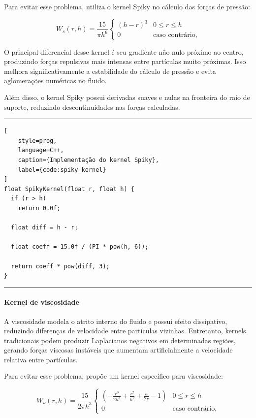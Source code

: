 Para evitar esse problema, \cite{muller2003particle} utiliza o kernel Spiky no
cálculo das forças de pressão:

\begin{equation}
W_{s}(r,h) =
\frac{15}{\pi h^6}
\begin{cases}
(h-r)^3 & 0 \le r \le h \\
0       & \text{caso contrário,}
\end{cases}
\label{eq:spiky_kernel}
\end{equation}

O principal diferencial desse kernel é seu gradiente não nulo próximo ao
centro, produzindo forças repulsivas mais intensas entre partículas muito
próximas. Isso melhora significativamente a estabilidade do cálculo de pressão
e evita aglomerações numéricas no fluido.

Além disso, o kernel Spiky possui derivadas suaves e nulas na fronteira do raio
de suporte, reduzindo descontinuidades nas forças calculadas.

\hfill
\hrule
\begin{lstlisting}[
    style=prog,
    language=C++,
    caption={Implementação do kernel Spiky},
    label={code:spiky_kernel}
]
float SpikyKernel(float r, float h) {
  if (r > h)
    return 0.0f;

  float diff = h - r;

  float coeff = 15.0f / (PI * pow(h, 6));

  return coeff * pow(diff, 3);
}
\end{lstlisting}
\hrule

\paragraph{Kernel de viscosidade}

A viscosidade modela o atrito interno do fluido e possui efeito dissipativo,
reduzindo diferenças de velocidade entre partículas vizinhas. Entretanto,
kernels tradicionais podem produzir Laplacianos negativos em determinadas
regiões, gerando forças viscosas instáveis que aumentam artificialmente a
velocidade relativa entre partículas.

Para evitar esse problema, \cite{muller2003particle} propõe um kernel
específico para viscosidade:

\begin{equation}
W_{\nu}(r,h) =
\frac{15}{2\pi h^3}
\begin{cases}
\left(
-\frac{r^3}{2h^3}
+\frac{r^2}{h^2}
+\frac{h}{2r}
-1
\right)
& 0 \le r \le h \\
0 & \text{caso contrário,}
\end{cases}
\label{eq:viscosity_kernel}
\end{equation}

